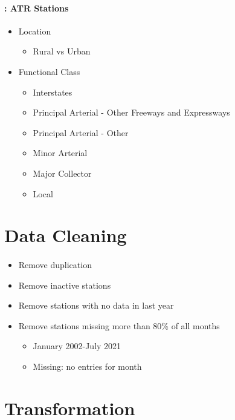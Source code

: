 \begin{frame}{\insertsectionhead}
	\framesubtitle{\insertsubsectionhead: ATR Stations}
	\begin{itemize}
		\item<+-> Location
		\begin{itemize}
			\item<+-> Rural vs Urban
		\end{itemize}
		\item<+-> Functional Class
		\begin{itemize}
			\item<+-> Interstates
			\item<+-> Principal Arterial - Other Freeways and Expressways
			\item<+-> Principal Arterial - Other
			\item<+-> Minor Arterial
			\item<+-> Major Collector
			\item<+-> Local
		\end{itemize}
	\end{itemize}
\end{frame}
\section{Data Cleaning}

\begin{frame}{\insertsectionhead}
	\framesubtitle{\insertsubsectionhead}
	\begin{itemize}
		\item<+-> Remove duplication
		\item<+-> Remove inactive stations
		\item<+-> Remove stations with no data in last year
		\item<+-> Remove stations missing more than 80\% of all months
		\begin{itemize}
			\item<+-> January 2002-July 2021
			\item<+-> Missing: no entries for month
		\end{itemize}
	\end{itemize}
\end{frame}

\section{Transformation}


